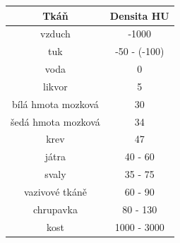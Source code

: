 \documentclass{thesis}%
\begin{document}
\begin{center}
\begin{tabular}{c|c}
 \centering
\bfseries \bfseries Tkáň & \bfseries Densita HU\\
\hline \hline
vzduch                      & -1000\\
tuk                            & -50 - (-100)\\
voda                         & 0\\
likvor                         & 5\\
bílá hmota mozková  & 30\\
šedá hmota mozková& 34\\
krev                           & 47\\
játra                          & 40 - 60\\
svaly                         & 35 - 75\\
vazivové tkáně         & 60 - 90\\
chrupavka                 & 80 - 130 \\
kost                           & 1000 - 3000 
\end{tabular}
\end{center}
\newpage
\end{document}
